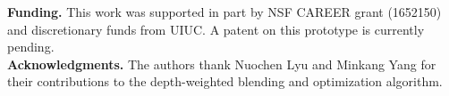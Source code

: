 \documentclass[9pt,twocolumn,twoside]{osajnl}
\begin{document}
\noindent\textbf{Funding.} This work was supported in part by NSF CAREER grant (1652150) and discretionary funds from UIUC. A patent on this prototype is currently pending.\\

\noindent\textbf{Acknowledgments.} The authors thank Nuochen Lyu and Minkang Yang for their contributions to the depth-weighted blending and optimization algorithm.

\end{document}
